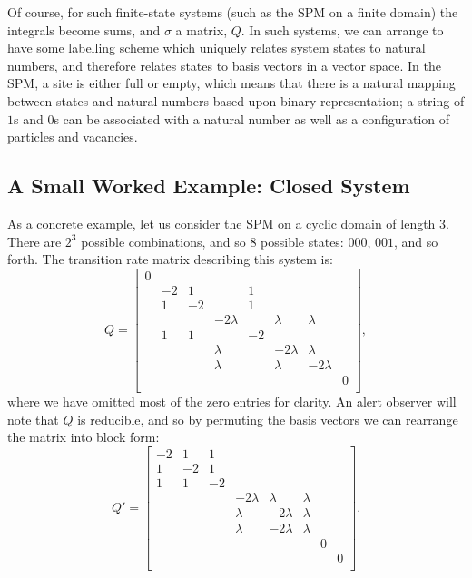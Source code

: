 Of course, for such finite-state systems (such as the SPM on a finite domain) the integrals become sums, and $\sigma$ a matrix, $Q$. In such systems, we can arrange to have some labelling scheme which uniquely relates system states to natural numbers, and therefore
relates states to basis vectors in a vector space. In the SPM, a site is either full or empty, which means that there is a natural mapping between states and natural numbers based upon binary representation;
a string of $1$s and $0$s can be associated with a natural number as well as a configuration of particles and vacancies.

\subsection{A Small Worked Example: Closed System} \label{sec:workedExampleClosed}

As a concrete example, let us consider the SPM on a cyclic domain of length $3$. There
are $2^3$ possible combinations, and so $8$ possible states: $000$, $001$, and so forth.
The transition rate matrix describing this system is:
\begin{equation}
 Q =
 \begin{bmatrix}
0  &   &   &           &   &   &   &   \\
   &-2 & 1 &           & 1 &   &   &   \\
   & 1 &-2 &           & 1 &   &   &   \\
   &   &   & -2\lambda &   &  \lambda &  \lambda &   \\
   & 1 & 1 &           & -2&   &   &   \\
   &   &   &  \lambda    &   &  -2\lambda & \lambda  &   \\
   &   &   &  \lambda  &    & \lambda  & -2 \lambda &   \\
   &   &   &           &   &   &   & 0  \\
\end{bmatrix},
\end{equation}
where we have omitted most of the zero entries for clarity.
An alert observer will note that $Q$ is reducible, and so by permuting the basis vectors
we can rearrange the matrix into block form:
\begin{equation}
 Q ' = 
 \begin{bmatrix}
-2  & 1 & 1 &           &   &   &   &   \\
 1 &-2 & 1 &           &  &   &   &   \\
 1 & 1 &-2 &           &  &   &   &   \\
   &   &   & -2\lambda & \lambda &  \lambda &   &    \\
   &   &   &      \lambda& -2\lambda   &  \lambda &   \\
   &   &   &  \lambda   &   -2\lambda & \lambda & &   \\
   &   &   &       &  &  & 0 &  \\
   &   &   &           &   &   &   & 0  \\
\end{bmatrix}.
\end{equation}

